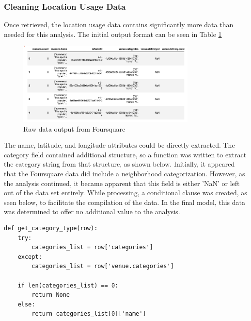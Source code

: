 \documentclass[11pt]{amsart}
\begin{document}
\subsubsection{Cleaning Location Usage Data}
Once retrieved, the location usage data contains significantly more data than needed for this analysis. The initial output format can be seen in Table \ref{tab:fsraw}

\begin{figure}[h]
\includegraphics[width=0.8\textwidth]{Foursquare_API_output_table_raw}
\caption{Raw data output from Foursquare}
\label{tab:fsraw}
\end{figure}

The name, latitude, and longitude attributes could be directly extracted. The category field contained additional structure, so a function was written to extract the category string from that structure, as shown below. 
Initially, it appeared that the Foursquare data did include a neighborhood categorization. However, as the analysis continued, it became apparent that this field is either 'NaN' or left out of the data set entirely. While processing, a conditional clause was created, as seen below, to facilitate the compilation of the data.  In the final model, this data was determined to offer no additional value to the analysis. 

\lstset{language=Python}
\begin{lstlisting}[caption={Category Extraction Function}]
def get_category_type(row):
    try:
        categories_list = row['categories']
    except:
        categories_list = row['venue.categories']
        
    if len(categories_list) == 0:
        return None
    else:
        return categories_list[0]['name']
\end{lstlisting}
\end{document}
